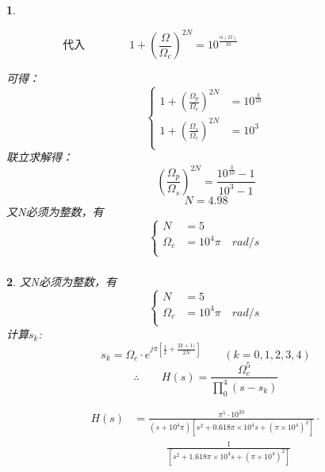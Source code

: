 \documentclass[notheorems,compress,mathserif,table]{beamer}
\newtheorem{dablock}{}
\begin{document}
\begin{frame}[shrink]\frametitle{}%
\begin{dablock}
        \begin{flushleft}
        $$\mbox{代入}\quad\quad\quad\quad
        1+(\frac{\Omega}{\Omega_{c}})^{2N}=10^{\frac{\alpha(\Omega)}{10}}
        \quad\quad\quad\quad\quad\quad\quad\quad\quad\quad$$
        \end{flushleft}
        可得：
        $$
        \left\{ \begin{aligned}
            1+(\frac{\Omega_{p}}{\Omega_{c}})^{2N} &= 10^{\frac{3}{10}}\\
            1+(\frac{\Omega_{s}}{\Omega_{c}})^{2N} &= 10^{3}\\
        \end{aligned} \right.
        $$
        联立求解得：
        $$(\frac{\Omega_{p}}{\Omega_{s}})^{2N} = \frac{10^{\frac{3}{10}}-1}{10^{3}-1}$$
        $$\mbox{$N=4.98$}$$
        又N必须为整数，有
        $$
        \left\{ \begin{aligned}
            N          &= 5\\
            \Omega_{c} &= 10^{4}\pi\quad rad/s\\
        \end{aligned} \right.
        $$
\end{dablock}
\end{frame}
%
%
\begin{frame}[shrink]\frametitle{}%
\begin{dablock}
又N必须为整数，有
$$
\left\{ \begin{aligned}
N          &= 5\\
\Omega_{c} &= 10^{4}\pi\quad rad/s\\
\end{aligned} \right.
$$
计算$s_k$:
$$s_{k}=\Omega_{c}\cdot e^{j\pi[\frac{1}{2}+\frac{2k+1)}{2N}]}     \quad\quad (k=0,1,2,3,4)$$
$$\therefore\quad\quad H(s)= \frac{\Omega^{5}_{c}}{\prod^4_{0}(s-s_k)}$$

\begin{equation*}
\begin{split}
  H(s) &=     \frac{\pi^{5}\cdot 10^{20}}{(s+10^4\pi)[s^2+0.618\pi\times10^4s+(\pi\times10^4)^2]}\cdot \\
       &\quad \quad\quad\frac{1}{[s^2+1.618\pi\times10^4s+(\pi\times10^4)^2]}
\end{split}
\end{equation*}
\end{dablock}
\end{frame}
\end{document}
